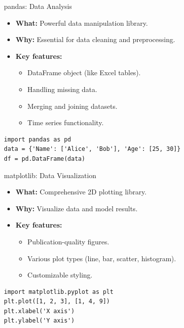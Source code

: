 \documentclass{beamer}
\begin{document}
	\begin{frame}[fragile]{pandas: Data Analysis}
		\begin{itemize}
			\item \textbf{What:} Powerful data manipulation library.
			\item \textbf{Why:} Essential for data cleaning and preprocessing.
			\item \textbf{Key features:}
			\begin{itemize}
				\item DataFrame object (like Excel tables).
				\item Handling missing data.
				\item Merging and joining datasets.
				\item Time series functionality.
			\end{itemize}
		\end{itemize}
		
		\begin{example}
			\begin{lstlisting}
import pandas as pd
data = {'Name': ['Alice', 'Bob'], 'Age': [25, 30]}
df = pd.DataFrame(data)
			\end{lstlisting}
		\end{example}
	\end{frame}
	
	\begin{frame}[fragile]{matplotlib: Data Visualization}
		\begin{itemize}
			\item \textbf{What:} Comprehensive 2D plotting library.
			\item \textbf{Why:} Visualize data and model results.
			\item \textbf{Key features:}
			\begin{itemize}
				\item Publication-quality figures.
				\item Various plot types (line, bar, scatter, histogram).
				\item Customizable styling.
			\end{itemize}
		\end{itemize}
		
		\begin{example}
			\begin{lstlisting}
import matplotlib.pyplot as plt
plt.plot([1, 2, 3], [1, 4, 9])
plt.xlabel('X axis')
plt.ylabel('Y axis')
			\end{lstlisting}
		\end{example}
	\end{frame}
	
\end{document}
